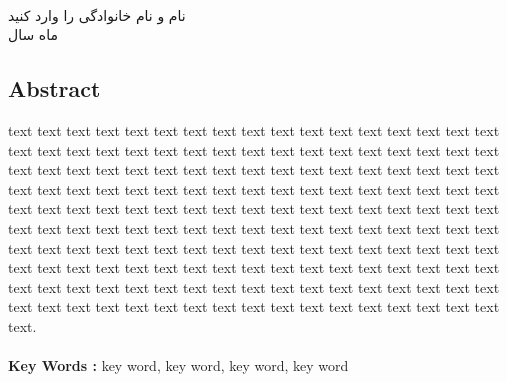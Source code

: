 \documentclass[a4paper,oneside]{book}
\renewcommand{\baselinestretch}{1.5}\normalsize
\begin{document}
	
	\hfill\\
	\begin{flushleft}
		نام و نام خانوادگی را وارد کنید\\
		ماه سال
	\end{flushleft}
	
	
	
	
	
	
\setcounter{tocdepth}{1}
\tableofcontents
\listoffigures
\newpage



























\appendix



















\renewcommand{\baselinestretch}{2}\normalsize



 \begin{latin}
 	\chapter*{Abstract}	
 	\thispagestyle{empty}
 	\renewcommand{\baselinestretch}{1.5}\normalsize
 	text text text text text text text text text text text text text text text text text text text text text text text text text text text text text text text text text text text text text text text text text text text text text text text text text text text text text text text text text text text text text text text text text text text text text text text text text text text text text text text text text text text text text text text text text text text text text text text text text text text text text text text text text text text text text text text text text text text text text text text text text text text text text text text text text text text text text text text text text text text text text text text text text text text text text text text text text text text text text text text text text text text text text text text text text text text. \\\\
 	\textbf{Key Words :} key word, key word, key word, key word
 \end{latin}
 
\end{document}

